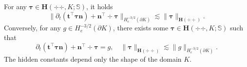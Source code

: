 \begin{lemma}
For any $\boldsymbol \tau\in\boldsymbol{H}(\div{\div },K; \mathbb{S})$,  it holds
\begin{equation}\label{eq:divdivtracee0}
\|\partial_t(\boldsymbol  t^{\intercal}\boldsymbol \tau\boldsymbol  n)+\boldsymbol  n^{\intercal}\div\boldsymbol \tau\|_{H_e^{-3/2}(\partial K)}\lesssim \|\boldsymbol{\tau}\|_{\boldsymbol{H}(\div{\div })}.
\end{equation}
Conversely, for any $g\in H_e^{-3/2}(\partial K)$, there exists some $\boldsymbol \tau\in\boldsymbol{H}(\div{\div },K; \mathbb{S})$ such that
\begin{equation}\label{eq:divdivinvtracee0}
\partial_t(\boldsymbol  t^{\intercal}\boldsymbol \tau\boldsymbol  n)+\boldsymbol  n^{\intercal}\div\boldsymbol \tau=g, \quad
\|\boldsymbol{\tau}\|_{\boldsymbol{H}(\div{\div })} \lesssim \|g\|_{H_e^{-3/2}(\partial K)}.
\end{equation}
The hidden constants depend only the shape of the domain $K$.
\end{lemma}
